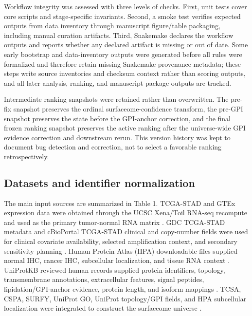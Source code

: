 \documentclass[review,12pt,authoryear]{elsarticle}
\begin{document}
Workflow integrity was assessed with three levels of checks. First, unit tests cover core scripts and stage-specific invariants. Second, a smoke test verifies expected outputs from data inventory through manuscript figure/\allowbreak{}table packaging, including manual curation artifacts. Third, Snakemake declares the workflow outputs and reports whether any declared artifact is missing or out of date. Some early bootstrap and data-inventory outputs were generated before all rules were formalized and therefore retain missing Snakemake provenance metadata;\allowbreak{} these steps write source inventories and checksum context rather than scoring outputs, and all later analysis, ranking, and manuscript-package outputs are tracked.

Intermediate ranking snapshots were retained rather than overwritten. The pre-fix snapshot preserves the ordinal surfaceome-confidence transform, the pre-GPI snapshot preserves the state before the GPI-anchor correction, and the final frozen ranking snapshot preserves the active ranking after the universe-wide GPI evidence correction and downstream rerun. This version history was kept to document bug detection and correction, not to select a favorable ranking retrospectively.

\subsection{Datasets and identifier normalization}

The main input sources are summarized in Table 1. TCGA-STAD and GTEx expression data were obtained through the UCSC Xena/\allowbreak{}Toil RNA-seq recompute and used as the primary tumor-normal RNA matrix \citep{goldman2020xena,vivian2017toil,gtex2020atlas}. GDC TCGA-STAD metadata and cBioPortal TCGA-STAD clinical and copy-number fields were used for clinical covariate availability, selected amplification context, and secondary sensitivity planning \citep{grossman2016gdc,cerami2012cbioportal}. Human Protein Atlas (HPA) downloadable files supplied normal IHC, cancer IHC, subcellular localization, and tissue RNA context \citep{uhlen2015hpa,uhlen2017pathology,thul2017subcellular}. UniProtKB reviewed human records supplied protein identifiers, topology, transmembrane annotations, extracellular features, signal peptides, lipidation/\allowbreak{}GPI-anchor evidence, protein length, and isoform mappings \citep{uniprot2025}. TCSA, CSPA, SURFY, UniProt GO, UniProt topology/\allowbreak{}GPI fields, and HPA subcellular localization were integrated to construct the surfaceome universe \citep{hu2021surfaceome,bauschfluck2015cspa,bauschfluck2018surfy}.
\end{document}
